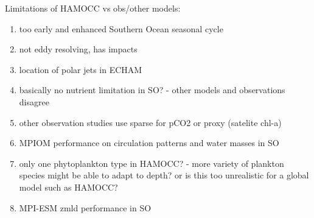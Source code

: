 Limitations of HAMOCC vs obs/other models:
\begin{enumerate}
\item too early and enhanced Southern Ocean seasonal cycle \citep{Nevison2016}
\item not eddy resolving, has impacts \citep{Marshall2012,Stoessel2015}
\item location of polar jets in ECHAM %
\item basically no nutrient limitation in SO? - other models and observations disagree
\item other observation studies use sparse for pCO2 or proxy (satelite chl-a)
\item MPIOM performance on circulation patterns and water masses in SO %
\item only one phytoplankton type in HAMOCC? - more variety of plankton species might be able to adapt to depth? or is this too unrealistic for a global model such as HAMOCC?
\item MPI-ESM zmld performance in SO \citep{Sallee2013}
\end{enumerate} 